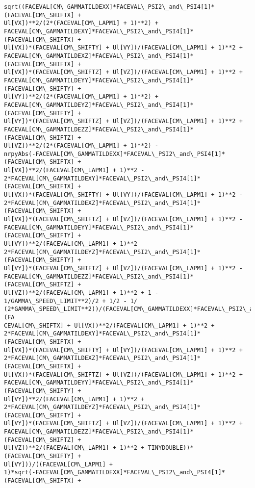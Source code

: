 \documentclass[landscape,letterpaper,10pt,english]{article}
\begin{document}
\begin{Verbatim}[commandchars=\\\{\}]
sqrt((FACEVAL[CM\_GAMMATILDEXX]*FACEVAL\_PSI2\_and\_PSI4[1]*(FACEVAL[CM\_SHIFTX] +
Ul[VX])**2/(2*(FACEVAL[CM\_LAPM1] + 1)**2) +
FACEVAL[CM\_GAMMATILDEXY]*FACEVAL\_PSI2\_and\_PSI4[1]*(FACEVAL[CM\_SHIFTX] +
Ul[VX])*(FACEVAL[CM\_SHIFTY] + Ul[VY])/(FACEVAL[CM\_LAPM1] + 1)**2 +
FACEVAL[CM\_GAMMATILDEXZ]*FACEVAL\_PSI2\_and\_PSI4[1]*(FACEVAL[CM\_SHIFTX] +
Ul[VX])*(FACEVAL[CM\_SHIFTZ] + Ul[VZ])/(FACEVAL[CM\_LAPM1] + 1)**2 +
FACEVAL[CM\_GAMMATILDEYY]*FACEVAL\_PSI2\_and\_PSI4[1]*(FACEVAL[CM\_SHIFTY] +
Ul[VY])**2/(2*(FACEVAL[CM\_LAPM1] + 1)**2) +
FACEVAL[CM\_GAMMATILDEYZ]*FACEVAL\_PSI2\_and\_PSI4[1]*(FACEVAL[CM\_SHIFTY] +
Ul[VY])*(FACEVAL[CM\_SHIFTZ] + Ul[VZ])/(FACEVAL[CM\_LAPM1] + 1)**2 +
FACEVAL[CM\_GAMMATILDEZZ]*FACEVAL\_PSI2\_and\_PSI4[1]*(FACEVAL[CM\_SHIFTZ] +
Ul[VZ])**2/(2*(FACEVAL[CM\_LAPM1] + 1)**2) -
nrpyAbs(-FACEVAL[CM\_GAMMATILDEXX]*FACEVAL\_PSI2\_and\_PSI4[1]*(FACEVAL[CM\_SHIFTX] +
Ul[VX])**2/(FACEVAL[CM\_LAPM1] + 1)**2 -
2*FACEVAL[CM\_GAMMATILDEXY]*FACEVAL\_PSI2\_and\_PSI4[1]*(FACEVAL[CM\_SHIFTX] +
Ul[VX])*(FACEVAL[CM\_SHIFTY] + Ul[VY])/(FACEVAL[CM\_LAPM1] + 1)**2 -
2*FACEVAL[CM\_GAMMATILDEXZ]*FACEVAL\_PSI2\_and\_PSI4[1]*(FACEVAL[CM\_SHIFTX] +
Ul[VX])*(FACEVAL[CM\_SHIFTZ] + Ul[VZ])/(FACEVAL[CM\_LAPM1] + 1)**2 -
FACEVAL[CM\_GAMMATILDEYY]*FACEVAL\_PSI2\_and\_PSI4[1]*(FACEVAL[CM\_SHIFTY] +
Ul[VY])**2/(FACEVAL[CM\_LAPM1] + 1)**2 -
2*FACEVAL[CM\_GAMMATILDEYZ]*FACEVAL\_PSI2\_and\_PSI4[1]*(FACEVAL[CM\_SHIFTY] +
Ul[VY])*(FACEVAL[CM\_SHIFTZ] + Ul[VZ])/(FACEVAL[CM\_LAPM1] + 1)**2 -
FACEVAL[CM\_GAMMATILDEZZ]*FACEVAL\_PSI2\_and\_PSI4[1]*(FACEVAL[CM\_SHIFTZ] +
Ul[VZ])**2/(FACEVAL[CM\_LAPM1] + 1)**2 + 1 - 1/GAMMA\_SPEED\_LIMIT**2)/2 + 1/2 - 1/
(2*GAMMA\_SPEED\_LIMIT**2))/(FACEVAL[CM\_GAMMATILDEXX]*FACEVAL\_PSI2\_and\_PSI4[1]*(FA
CEVAL[CM\_SHIFTX] + Ul[VX])**2/(FACEVAL[CM\_LAPM1] + 1)**2 +
2*FACEVAL[CM\_GAMMATILDEXY]*FACEVAL\_PSI2\_and\_PSI4[1]*(FACEVAL[CM\_SHIFTX] +
Ul[VX])*(FACEVAL[CM\_SHIFTY] + Ul[VY])/(FACEVAL[CM\_LAPM1] + 1)**2 +
2*FACEVAL[CM\_GAMMATILDEXZ]*FACEVAL\_PSI2\_and\_PSI4[1]*(FACEVAL[CM\_SHIFTX] +
Ul[VX])*(FACEVAL[CM\_SHIFTZ] + Ul[VZ])/(FACEVAL[CM\_LAPM1] + 1)**2 +
FACEVAL[CM\_GAMMATILDEYY]*FACEVAL\_PSI2\_and\_PSI4[1]*(FACEVAL[CM\_SHIFTY] +
Ul[VY])**2/(FACEVAL[CM\_LAPM1] + 1)**2 +
2*FACEVAL[CM\_GAMMATILDEYZ]*FACEVAL\_PSI2\_and\_PSI4[1]*(FACEVAL[CM\_SHIFTY] +
Ul[VY])*(FACEVAL[CM\_SHIFTZ] + Ul[VZ])/(FACEVAL[CM\_LAPM1] + 1)**2 +
FACEVAL[CM\_GAMMATILDEZZ]*FACEVAL\_PSI2\_and\_PSI4[1]*(FACEVAL[CM\_SHIFTZ] +
Ul[VZ])**2/(FACEVAL[CM\_LAPM1] + 1)**2 + TINYDOUBLE))*(FACEVAL[CM\_SHIFTY] +
Ul[VY]))/((FACEVAL[CM\_LAPM1] +
1)*sqrt(-FACEVAL[CM\_GAMMATILDEXX]*FACEVAL\_PSI2\_and\_PSI4[1]*(FACEVAL[CM\_SHIFTX] +

\end{Verbatim}
\end{document}
